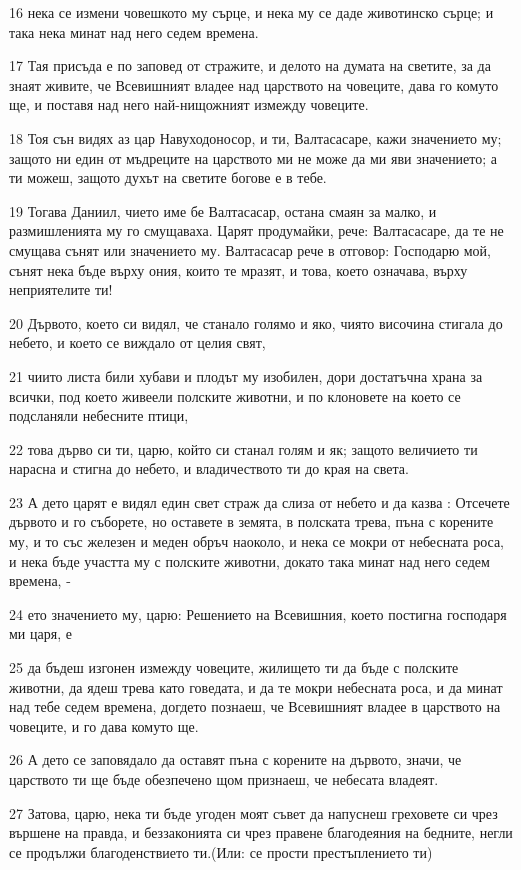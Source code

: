 \par 16 нека се измени човешкото му сърце, и нека му се даде животинско сърце; и така нека минат над него седем времена.
\par 17 Тая присъда е по заповед от стражите, и делото на думата на светите, за да знаят живите, че Всевишният владее над царството на човеците, дава го комуто ще, и поставя над него най-нищожният измежду човеците.
\par 18 Тоя сън видях аз цар Навуходоносор, и ти, Валтасасаре, кажи значението му; защото ни един от мъдреците на царството ми не може да ми яви значението; а ти можеш, защото духът на светите богове е в тебе.
\par 19 Тогава Даниил, чието име бе Валтасасар, остана смаян за малко, и размишленията му го смущаваха. Царят продумайки, рече: Валтасасаре, да те не смущава сънят или значението му. Валтасасар рече в отговор: Господарю мой, сънят нека бъде върху ония, които те мразят, и това, което означава, върху неприятелите ти!
\par 20 Дървото, което си видял, че станало голямо и яко, чиято височина стигала до небето, и което се виждало от целия свят,
\par 21 чиито листа били хубави и плодът му изобилен, дори достатъчна храна за всички, под което живеели полските животни, и по клоновете на което се подсланяли небесните птици,
\par 22 това дърво си ти, царю, който си станал голям и як; защото величието ти нарасна и стигна до небето, и владичеството ти до края на света.
\par 23 А дето царят е видял един свет страж да слиза от небето и да казва : Отсечете дървото и го съборете, но оставете в земята, в полската трева, пъна с корените му, и то със железен и меден обръч наоколо, и нека се мокри от небесната роса, и нека бъде участта му с полските животни, докато така минат над него седем времена, -
\par 24 ето значението му, царю: Решението на Всевишния, което постигна господаря ми царя, е
\par 25 да бъдеш изгонен измежду човеците, жилището ти да бъде с полските животни, да ядеш трева като говедата, и да те мокри небесната роса, и да минат над тебе седем времена, догдето познаеш, че Всевишният владее в царството на човеците, и го дава комуто ще.
\par 26 А дето се заповядало да оставят пъна с корените на дървото, значи, че царството ти ще бъде обезпечено щом признаеш, че небесата владеят.
\par 27 Затова, царю, нека ти бъде угоден моят съвет да напуснеш греховете си чрез вършене на правда, и беззаконията си чрез правене благодеяния на бедните, негли се продължи благоденствието ти.(Или: се прости престъплението ти)
